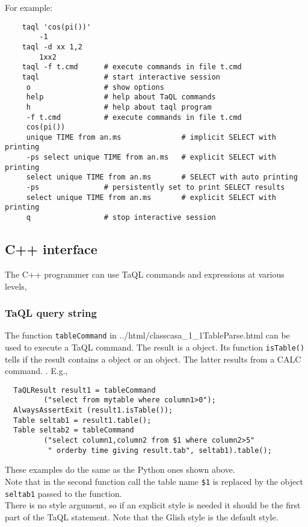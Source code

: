   For example:
\begin{verbatim}
    taql 'cos(pi())'
        -1
    taql -d xx 1,2
        1xx2
    taql -f t.cmd      # execute commands in file t.cmd
    taql               # start interactive session
     o                 # show options
     help              # help about TaQL commands
     h                 # help about taql program
     -f t.cmd          # execute commands in file t.cmd
     cos(pi())
     unique TIME from an.ms              # implicit SELECT with printing
     -ps select unique TIME from an.ms   # explicit SELECT with printing
     select unique TIME from an.ms       # SELECT with auto printing
     -ps               # persistently set to print SELECT results
     select unique TIME from an.ms       # explicit SELECT with printing
     q                 # stop interactive session
\end{verbatim}

\subsection{C++ interface}
The C++ programmer can use TaQL commands and expressions at various levels,
\subsubsection{TaQL query string}
    The function \texttt{tableCommand} in
    {../html/classcasa_1_1TableParse.html}
    can be used to execute a TaQL command. The result is a
    object. Its function \texttt{isTable()} tells if the result
    contains a 
    object or an
    object. The latter results from a CALC command.
 . E.g.,
\begin{verbatim}
  TaQLResult result1 = tableCommand
         ("select from mytable where column1>0");
  AlwaysAssertExit (result1.isTable());
  Table seltab1 = result1.table();
  Table seltab2 = tableCommand
         ("select column1,column2 from $1 where column2>5"
          " orderby time giving result.tab", seltab1).table();
\end{verbatim}
    These examples do the same as the Python ones shown above.
    \\Note that in the second function call the table name
    \texttt{\$1} is replaced by the object \texttt{seltab1}
    passed to the function.
    \\There is no style argument, so if an explicit style is needed it
    should be the first part of the TaQL statement. Note that the
    Glish style is the default style.

